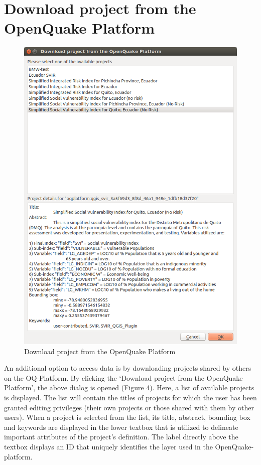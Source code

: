 \chapter{Download project from the OpenQuake Platform}

\begin{figure}
    \centering
    \includegraphics[width=\textwidth]{../images/image15}
    \caption{Download project from the OpenQuake Platform}
    \label{fig:download_project_from_platform}
\end{figure}

An additional option to access data is by downloading projects shared by others
on the OQ-Platform. By clicking the `Download project from the OpenQuake
Platform', the above dialog is opened (Figure 4). Here, a list of available
projects is displayed. The list will contain the titles of projects for which
the user has been granted editing privileges (their own projects or those
shared with them by other users). When a project is selected from the list, its
title, abstract, bounding box and keywords are displayed in the lower textbox
that is utilized to delineate important attributes of the project's definition.
The label directly above the textbox displays an ID that uniquely identifies
the layer used in the OpenQuake-platform.

